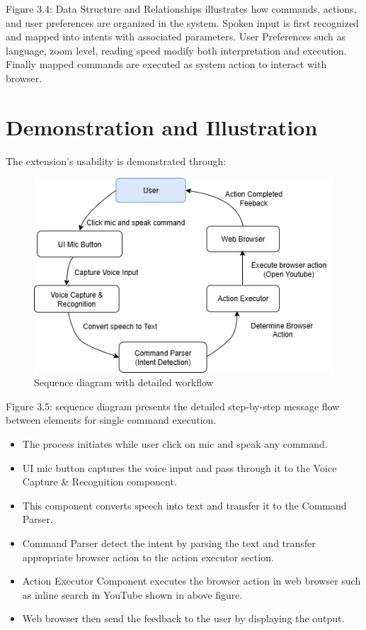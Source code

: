 Figure 3.4: Data Structure and Relationships illustrates how commands, actions, and user preferences are organized in the system. Spoken input is first recognized and mapped into intents with associated parameters. User Preferences such as language, zoom level, reading speed modify both interpretation and execution. Finally mapped commands are executed as system action to interact with browser.

\bigskip
\bigskip
\bigskip

\section{Demonstration and Illustration}
The extension’s usability is demonstrated through:

\begin{figure}[ht]
   \centering
   \includegraphics[width=5.5in]{latex/Chap3/sequence-diagram.png}
   \caption{Sequence diagram with detailed workflow }
   \label{fig:model}
\end{figure}
Figure 3.5: sequence diagram presents the detailed step-by-step message flow between elements for single command execution.

\begin{itemize}
\item The process initiates while user click on mic and speak any command.
\item	UI mic button captures the voice input and pass through it to the Voice Capture \& Recognition component.
\item This component converts speech into text and transfer it to the Command Parser.
\item Command Parser detect the intent by parsing the text and transfer appropriate browser action to the action executor section. 
\item Action Executor Component executes the browser action in web browser such as inline search in YouTube shown in above figure. 
\item Web browser then send the feedback to the user by displaying the output.
\end{itemize}

